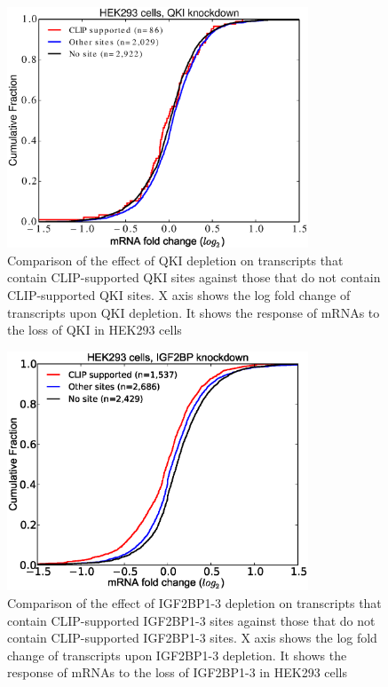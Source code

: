 \begin{figure}[H]
	\centering
	\includegraphics[width=0.8\textwidth,clip]{ch4_results_discussion/figures/Hafner_HEK293_QKI_SetAB_avg_CLIP_supported_notsupported_THNone_corrected_2015_8_28.eps}
\caption[Comparison between CLIP-supported QKI sites and other sites]{Comparison of the effect of QKI depletion on transcripts that contain CLIP-supported QKI sites against those that do not contain CLIP-supported QKI sites. X axis shows the log fold change of transcripts upon QKI depletion. It shows the response of mRNAs to the loss of QKI in HEK293 cells}
\label{QKI_CLIP-supported}
\end{figure}

\begin{figure}[H]
	\centering
	\includegraphics[width=0.8\textwidth,clip]{ch4_results_discussion/figures/Hafner_HEK293_IGF2BP1-2_CLIP_supported_notsupported_THNone_2015_8_28_corrected.eps}
\caption[Comparison between CLIP-supported IGF2BP1-3 sites and other sites]{Comparison of the effect of IGF2BP1-3 depletion on transcripts that contain CLIP-supported IGF2BP1-3 sites against those that do not contain CLIP-supported IGF2BP1-3 sites. X axis shows the log fold change of transcripts upon IGF2BP1-3 depletion. It shows the response of mRNAs to the loss of IGF2BP1-3 in HEK293 cells}
\label{IGF_CLIP-supported}
\end{figure}

